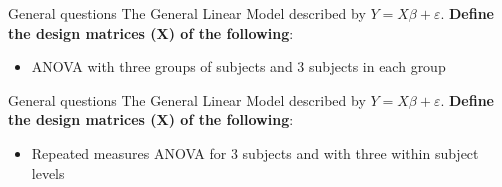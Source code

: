 \documentclass{beamer}
\begin{document}
\begin{frame}{General questions} 
  The General Linear Model described by $Y=X\beta+\varepsilon$. \textbf{Define the design matrices (X) of the following}:

  \begin{itemize}
    \item ANOVA with three groups of subjects and 3 subjects in each group
  \end{itemize}

\end{frame}


\begin{frame}{General questions}
  The General Linear Model described by $Y=X\beta+\varepsilon$. \textbf{Define the design matrices (X) of the following}:

  \begin{itemize}
    \item Repeated measures ANOVA for 3 subjects and with three within subject levels
  \end{itemize}

\end{frame}
\end{document}
